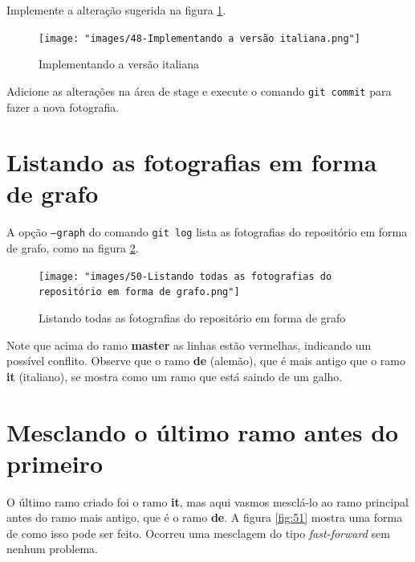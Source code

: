 \documentclass[a4paper]{book}
\begin{document}
Implemente a alteração sugerida na figura \ref{fig:48}.

\begin{figure}[ht]
\caption{Implementando a versão italiana}
\label{fig:48}
\centering
\texttt{[image: "images/48-Implementando a versão italiana.png"]}
\end{figure}

Adicione as alterações na área de stage e execute
o comando \texttt{git commit} para fazer a nova fotografia.

%

\newpage
\section{Listando as fotografias em forma de grafo}

A opção \texttt{--graph} do comando \texttt{git log}
lista as fotografias do repositório em forma de grafo,
como na figura \ref{fig:50}.


\begin{figure}[h!]
\caption{Listando todas as fotografias do repositório em forma de grafo}
\label{fig:50}
\centering
\texttt{[image: "images/50-Listando todas as fotografias do repositório em forma de grafo.png"]}
\end{figure}

Note que acima do ramo \textbf{master} as linhas estão
vermelhas, indicando um possível conflito.
Observe que o ramo \textbf{de} (alemão), que é mais
antigo que o ramo \textbf{it} (italiano), se mostra como
um ramo que está saindo de um galho.



\section{Mesclando o último ramo antes do primeiro}

O último ramo criado foi o ramo \textbf{it},
mas aqui vasmos mesclá-lo ao ramo principal
antes do ramo mais antigo, que é o ramo \textbf{de}.
A figura \ref{fig:51} mostra uma forma de como isso 
pode ser feito.
Ocorreu uma mesclagem do tipo \textit{fast-forward}
sem nenhum problema.
\end{document}
